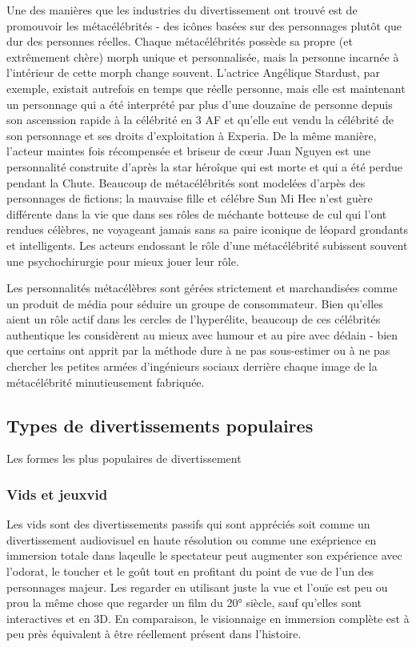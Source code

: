 Une des manières que les industries du divertissement ont trouvé est de promouvoir les métacélébrités - des icônes basées sur des personnages plutôt que dur des personnes réelles. Chaque métacélébrités possède sa propre (et extrêmement chère) morph unique et personnalisée, mais la personne incarnée à l'intérieur de cette morph change souvent. L'actrice Angélique Stardust, par exemple, existait autrefois en temps que réelle personne, mais elle est maintenant un personnage qui a été interprété par plus d'une douzaine de personne depuis son ascenssion rapide à la célébrité en 3 AF et qu'elle eut vendu la célébrité de son personnage et ses droits d'exploitation à Experia. De la même manière, l'acteur maintes fois récompensée et briseur de cœur Juan Nguyen est une personnalité construite d'après la star héroîque qui est morte et qui a été perdue pendant la Chute. Beaucoup de métacélébrités sont modelées d'arpès des personnages de fictions; la mauvaise fille et célébre Sun Mi Hee n'est guère différente dans la vie que dans ses rôles de méchante botteuse de cul qui l'ont rendues célèbres, ne voyageant jamais sans sa paire iconique de léopard grondants et intelligents. Les acteurs endossant le rôle d'une métacélébrité subissent souvent une psychochirurgie pour mieux jouer leur rôle. 

Les personnalités métacélèbres sont gérées strictement et marchandisées comme un produit de média pour séduire un groupe de consommateur. Bien qu'elles aient un rôle actif dans les cercles de l'hyperélite, beaucoup de ces célébrités authentique les considèrent au mieux avec humour et au pire avec dédain - bien que certains ont apprit par la méthode dure à ne pas sous-estimer ou à ne pas chercher les petites armées d'ingénieurs sociaux derrière chaque image de la métacélébrité minutieusement fabriquée. 

\subsection{Types de divertissements populaires} \label{sec:popul-types-entert} 

Les formes les plus populaires de divertissement  

\subsubsection{Vids et jeuxvid} \label{sec:vids-vidgames} 

Les vids sont des divertissements passifs qui sont appréciés soit comme un divertissement audiovisuel en haute résolution ou comme une exéprience en immersion totale dans laqeulle le spectateur peut augmenter son expérience avec l'odorat, le toucher et le goût tout en profitant du point de vue de l'un des personnages majeur. Les regarder en utilisant juste la vue et l'ouïe est peu ou prou la même chose que regarder un film du 20° siècle, sauf qu'elles sont interactives et en 3D. En comparaison, le visionnaige en immersion complète est à peu près équivalent à être réellement présent dans l'histoire. 

